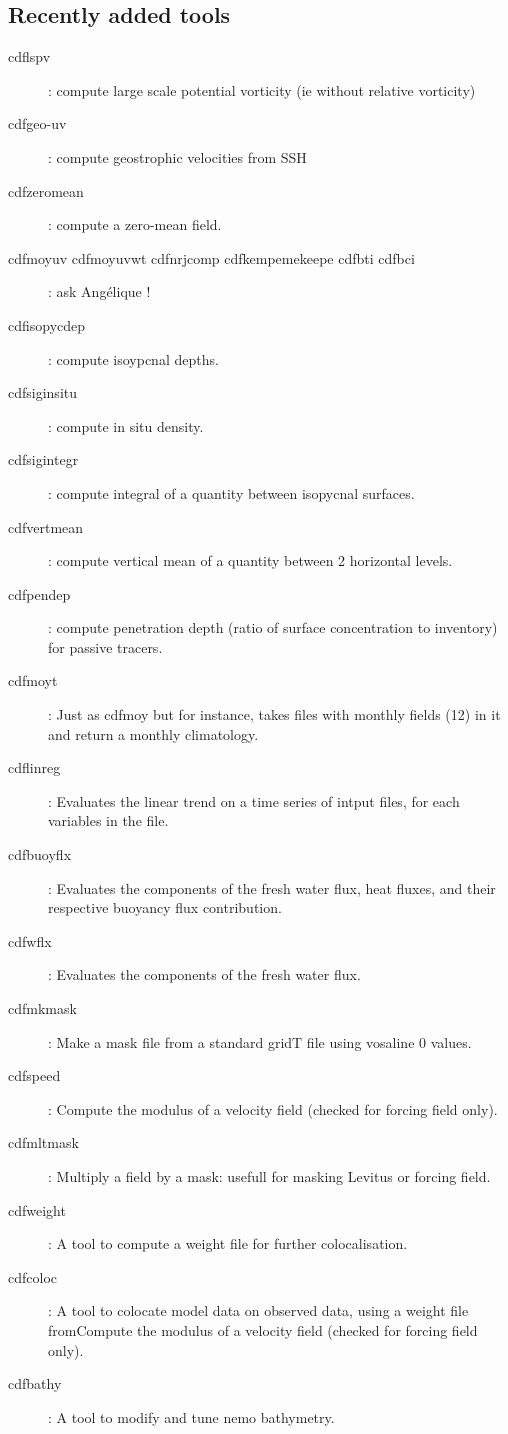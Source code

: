 \documentclass[a4paper,11pt]{article}
\begin{document}
\subsection*{Recently added tools}
\begin{description}
\item[cdflspv] : compute large scale potential vorticity (ie without relative vorticity)
\item[cdfgeo-uv] : compute geostrophic velocities from SSH
\item[cdfzeromean] : compute a zero-mean field.
\item[cdfmoyuv cdfmoyuvwt cdfnrjcomp cdfkempemekeepe cdfbti cdfbci] : ask Ang\'elique !
\item[cdfisopycdep] : compute isoypcnal depths.
\item[cdfsiginsitu] : compute in situ density.
\item[cdfsigintegr] : compute integral of a quantity between isopycnal surfaces.
\item[cdfvertmean] : compute vertical mean of a quantity between 2 horizontal levels.
\item[cdfpendep] : compute penetration depth (ratio of surface concentration to inventory) for passive tracers.
\item[cdfmoyt] : Just as cdfmoy  but for instance, takes files with monthly fields (12) in it and return a monthly climatology.
\item[cdflinreg] : Evaluates the linear trend on a time series of intput files, for each variables in the file.
\item[cdfbuoyflx] : Evaluates the components of the fresh water flux, heat fluxes, and their respective buoyancy flux contribution.
\item[cdfwflx] : Evaluates the components of the fresh water flux.
\item[cdfmkmask] : Make a mask file from a standard gridT file using vosaline 0 values.
\item[cdfspeed] : Compute the modulus of a velocity field (checked for forcing field only).
\item[cdfmltmask] : Multiply a field by a mask: usefull for masking Levitus or forcing field.
\item[cdfweight] : A tool to compute a weight file for further colocalisation.
\item[cdfcoloc] : A tool to colocate model data on observed data, using a weight file fromCompute the modulus of a velocity field (checked for forcing field only).
\item[cdfbathy] : A tool to modify and tune nemo bathymetry.

\end{description}
\end{document}
